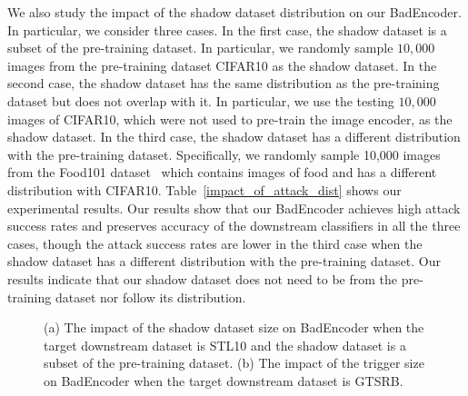 We also study the impact of the shadow dataset distribution on our BadEncoder. In particular, we consider three cases. In the first case, the shadow dataset is a subset of the pre-training dataset. In particular,  we randomly sample $10,000$ images from the pre-training dataset CIFAR10 as the shadow dataset. In the second case,  the shadow dataset has the same distribution as the pre-training dataset but does not  overlap with it. In particular, we use the testing $10,000$ images of CIFAR10, which were not used to pre-train the image encoder, as the shadow dataset. In the third case,  the shadow dataset has a different distribution with the pre-training dataset. Specifically, we randomly sample 10,000 images from the Food101 dataset~\cite{bossard14} which contains images of food and  has a different distribution with CIFAR10.
Table~\ref{impact_of_attack_dist} shows our experimental results. Our results show that our BadEncoder achieves high attack success rates and preserves accuracy of the downstream classifiers in all the three cases, though the attack success rates are lower in the third case when the shadow dataset has a different distribution with the pre-training dataset. 
Our results indicate that our shadow dataset does not need to be from the pre-training dataset nor follow its  distribution. 







\begin{figure}[!t]
	 \centering
	 \vspace{-5mm}
\caption{(a) The impact of the shadow dataset size on  BadEncoder when  the target downstream dataset is STL10 and the shadow dataset is a subset of the pre-training dataset. (b) The impact of the trigger size on BadEncoder when the target downstream dataset is GTSRB. }
\vspace{-2mm}
\end{figure}

